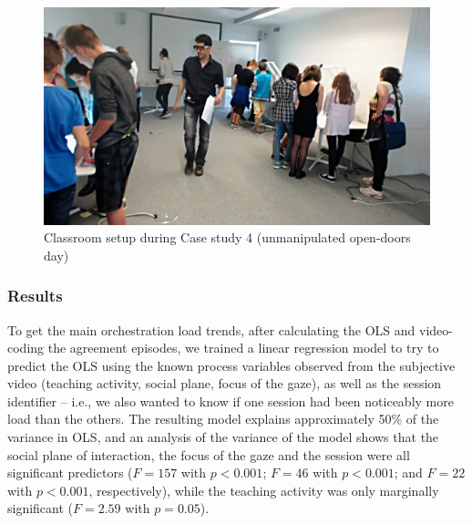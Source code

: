 \documentclass[10pt,journal,compsoc]{IEEEtran}
\begin{document}

\begin{figure}[!t]
\centering
\includegraphics[width=\linewidth]{img/Case4Picture}
\caption{Classroom setup during Case study 4 (unmanipulated open-doors day)}
\label{fig:case4picture}
\end{figure}

\subsubsection{Results}

To get the main orchestration load trends, after calculating the OLS and video-coding the agreement episodes, we trained a linear regression model to try to predict the OLS using the known process variables observed from the subjective video (teaching activity, social plane, focus of the gaze), as well as the session identifier -- i.e., we also wanted to know if one session had been noticeably more load than the others. The resulting model explains approximately 50\% of the variance in OLS,  and an analysis of the variance of the model shows that the social plane of interaction, the focus of the gaze and the session were all significant predictors ($F=157$ with $p<0.001$; $F=46$ with $p<0.001$; and $F=22$ with $p<0.001$, respectively), while the teaching activity was only marginally significant ($F=2.59$ with $p=0.05$).
\end{document}

